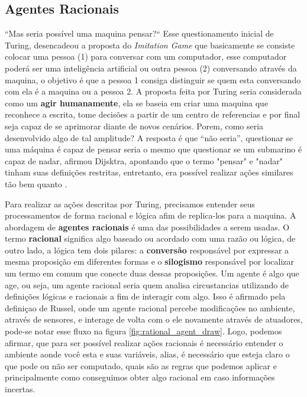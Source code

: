 \subsection{Agentes Racionais}
“Mas seria possível uma maquina pensar?“ Esse questionamento inicial de Turing, desencadeou a proposta do \textit{Imitation Game} que basicamente se consiste colocar uma pessoa (1) para conversar com um computador, esse computador poderá ser uma inteligência artificial ou outra pessoa (2) conversando através da maquina, o objetivo é que a pessoa 1 consiga distinguir se quem esta conversando com ela é a maquina ou a pessoa 2. A proposta feita por Turing seria considerada como um \textbf{agir humanamente}, ela se baseia em criar uma maquina que reconhece a escrita, tome decisões a partir de um centro de referencias e por final seja capaz de se aprimorar diante de novos cenários. Porem, como seria desenvolvido algo de tal amplitude? A resposta é que “não seria”, questionar se uma máquina é capaz de pensar seria o mesmo que questionar se um submarino é capaz de nadar, afirmou Dijsktra, apontando que o termo "pensar" e "nadar" tinham suas definições restritas, entretanto, era possível realizar ações similares tão bem quanto \cite[2-3]{dijkstra898, turing1950, russell2003artificial}.

Para realizar as ações descritas por Turing, precisamos entender seus processamentos de forma racional e lógica afim de replica-los para a maquina. A abordagem de \textbf{agentes racionais} é uma das possibilidades a serem usadas. O termo \textbf{racional} significa algo baseado ou acordado com uma razão ou lógica, de outro lado, a lógica tem dois pilares: a \textbf{conversão} responsável por expressar a mesma proposição em diferentes formas e o \textbf{silogismo} responsável por localizar um termo em comum que conecte duas dessas proposições. Um agente é algo que age, ou seja, um agente racional seria quem analisa circustancias utilizando de definições lógicas e racionais a fim de interagir com algo. Isso é afirmado pela definiçao de Russel, onde um agente racional percebe modificações no ambiente, através de sensores, e interage de volta com o ele novamente através de atuadores, pode-se notar esse fluxo na figura \ref{fig:rational_agent_draw}. Logo, podemos afirmar, que para ser possível realizar ações racionais é necessário entender o ambiente aonde você esta e suas variáveis, alias, é necessário que esteja claro o que pode ou não ser computado, quais são as regras que podemos aplicar e principalmente como conseguimos obter algo racional em caso informações incertas. \cite[7]{frege1956thought, wooldridge1994agent, simon1955behavioral, boole1854investigation, russell2003artificial}

